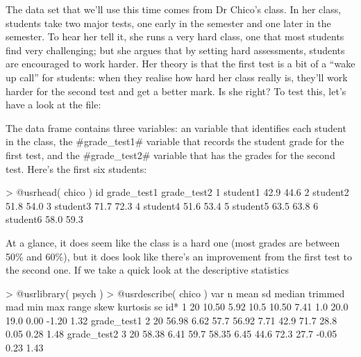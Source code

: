The data set that we'll use this time comes from Dr Chico's class. In her class, students take two major tests, one early in the semester and one later in the semester. To hear her tell it, she runs a very hard class, one that most students find very challenging; but she argues that by setting hard assessments, students are encouraged to work harder. Her theory is that the first test is a bit of a ``wake up call'' for students: when they realise how hard her class really is, they'll work harder for the second test and get a better mark. Is she right? To test this, let's have a look at the  file: 
The data frame  contains three variables: an  variable that identifies each student in the class, the \rtextverb#grade_test1# variable that records the student grade for the first test, and the \rtextverb#grade_test2# variable that has the grades for the second test. Here's the first six students:
\begin{rblock1}
> @usr{head( chico )}
        id grade_test1 grade_test2
1 student1        42.9        44.6
2 student2        51.8        54.0
3 student3        71.7        72.3
4 student4        51.6        53.4
5 student5        63.5        63.8
6 student6        58.0        59.3
\end{rblock1}
At a glance, it does seem like the class is a hard one (most grades are between 50\% and 60\%), but it does look like there's an improvement from the first test to the second one. If we take a quick look at the descriptive statistics
\begin{rblock1}
> @usr{library( psych )}
> @usr{describe( chico )}
            var  n  mean   sd median trimmed  mad  min  max range  skew kurtosis   se
id*           1 20 10.50 5.92   10.5   10.50 7.41  1.0 20.0  19.0  0.00    -1.20 1.32
grade_test1   2 20 56.98 6.62   57.7   56.92 7.71 42.9 71.7  28.8  0.05     0.28 1.48
grade_test2   3 20 58.38 6.41   59.7   58.35 6.45 44.6 72.3  27.7 -0.05     0.23 1.43
\end{rblock1}
